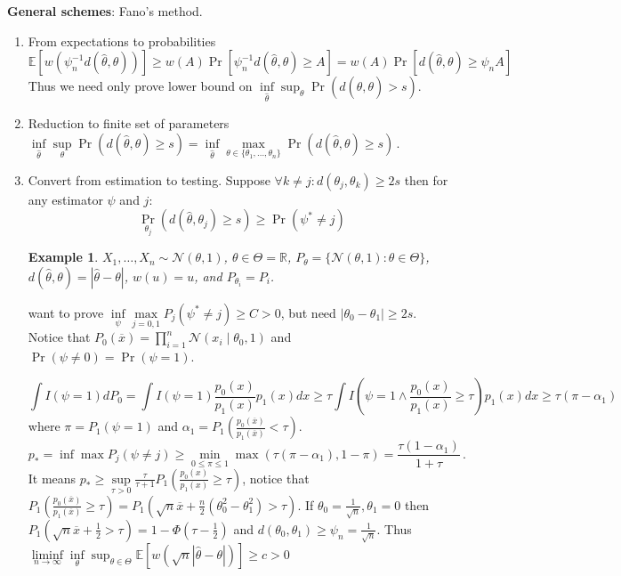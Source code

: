 \documentclass[10pt]{article}
\newtheorem{example}[ex]{Example}
\newcommand{\Expect}[1]{\mathbb{E}\!\left[#1\right]}
\renewcommand{\bar}{\overline}
\renewcommand{\hat}{\widehat}
\begin{document}
\textbf{General schemes}: Fano's method.
\begin{enumerate}
	\item From expectations to probabilities
	$$\Expect{w(\psi_n^{-1}d(\hat{\theta},\theta))} \geq w(A)\Pr[\psi_n^{-1}d(\hat{\theta},\theta)\geq A] = w(A)\Pr[d(\hat{\theta},\theta)\geq \psi_n A] $$
	Thus we need only prove lower bound on $\inf\limits_{\hat{\theta}}\sup_{\theta} \Pr(d(\hat{\theta},\theta)>s)$.
	\item Reduction to finite set of parameters
	$ \inf\limits_{\hat{\theta}}\sup\limits_{\theta}\Pr(d(\hat{\theta},\theta)\geq s) = \inf\limits_{\hat{\theta}}\max\limits_{\theta \in \{\theta_1,\dotsc, \theta_n\}}\Pr(d(\hat{\theta},\theta)\geq s)\,.$
	\item Convert from estimation to testing. Suppose $\forall{k\neq j} :d(\theta_j, \theta_k) \geq 2s$ then for any estimator $\psi$
	and $j$:
	$$ \Pr_{\theta_j}(d(\hat{\theta},\theta_j)\geq s) \geq \Pr(\psi^* \neq j)$$
	\begin{example}
		$X_1, \dotsc, X_n \sim \mathcal{N}(\theta, 1)$, $\theta \in \Theta = \mathbb{R}$, $P_{\theta}=\{\mathcal{N}(\theta, 1) : \theta \in \Theta\}$, $d(\hat{\theta}, \theta)=|\hat{\theta}-\theta|$, $w(u)=u$, and $P_{\theta_i}=P_i$.
	\end{example}
	want to prove $\inf\limits_{\psi}\max\limits_{j=0,1}P_j(\psi^* \neq j) \geq C > 0$, but need $|\theta_0-\theta_1| \geq 2s$.
	Notice that $P_0(\bar{x})=\prod\limits_{i=1}^n\mathcal{N}(x_i \mid \theta_0, 1)$ and $\Pr(\psi \neq 0)=\Pr(\psi = 1)$.
	
	$$ \int I(\psi = 1) d{P_0} = \int{I(\psi=1)\frac{p_0(x)}{p_1(x)}p_1(x)}dx \geq \tau \int{I\left(\psi = 1\land \frac{p_0(x)}{p_1(x)} \geq \tau \right)}p_1(x)dx \geq \tau(\pi - \alpha_1)$$
	where $\pi=P_1(\psi=1)$ and $\alpha_1=P_1\left(\frac{p_0(\bar{x})}{p_1(\bar{x})} < \tau\right)$.
	$$ p_{*}=\inf\max{P_j(\psi \neq j)} \geq \min\limits_{0 \leq \pi \leq 1}\max(\tau(\pi - \alpha_1),1-\pi) = \frac{\tau(1-\alpha_1)}{1+\tau}\,.$$
	It means $p_{*}\geq \sup\limits_{\tau > 0}\frac{\tau}{\tau+1}P_1\left(\frac{p_0(x)}{p_1(x)}\geq \tau\right)$, notice that	$P_1\left(\frac{p_0(\bar{x})}{p_1(\bar{x})} \geq \tau \right) = P_1(\sqrt{n}\bar{x} + \frac{n}{2}(\theta_0^2-\theta_1^2) > \tau)$. If $\theta_0=\frac{1}{\sqrt{n}}, \theta_1=0$ then $P_1(\sqrt{n}\bar{x}+\frac{1}{2} > \tau)=1-\Phi(\tau-\frac{1}{2})$ and 
	$d(\theta_0, \theta_1)\geq \psi_n = \frac{1}{\sqrt{n}}$.
	Thus $\liminf\limits_{n \to \infty}\inf\limits_{\theta}\sup_{\theta \in \Theta}\Expect{w(\sqrt{n}|\hat{\theta}-\theta|)}\geq{c}>0$
\end{enumerate}
%
%
\end{document}

